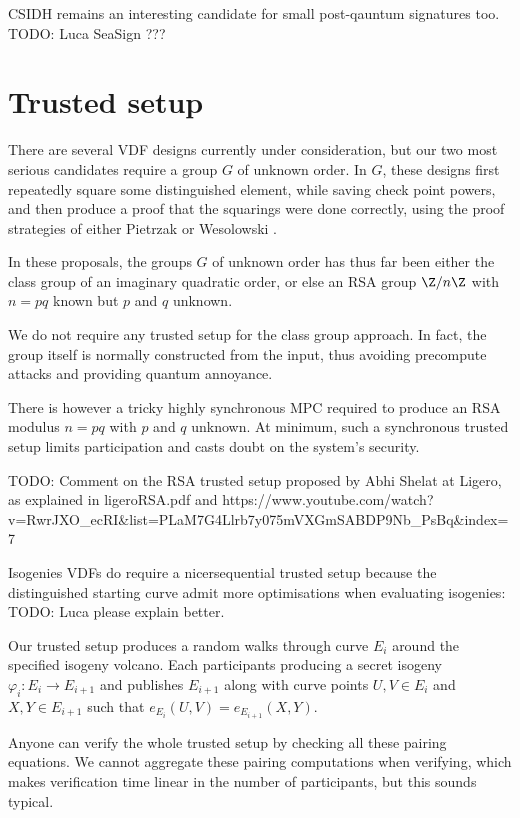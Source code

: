 \documentclass{article}
\begin{document}
CSIDH remains an interesting candidate for small post-qauntum signatures
too.  TODO: Luca SeaSign ???



\section{Trusted setup}

There are several VDF designs currently under consideration, but
our two most serious candidates require a group $G$ of unknown order.
In $G$, these designs first repeatedly square some distinguished
element, while saving check point powers, and then produce a proof
that the squarings were done correctly, using the proof strategies
of either Pietrzak \cite{Pietrzak} or Wesolowski \cite{Wesolowski}.

In these proposals, the groups $G$ of unknown order has thus far been
either the class group of an imaginary quadratic order, or else an
RSA group $\Z/n\Z$ with $n = p q$ known but $p$ and $q$ unknown.

We do not require any trusted setup for the class group approach.
In fact, the group itself is normally constructed from the input,
thus avoiding precompute attacks and providing quantum annoyance.  

There is however a tricky highly synchronous MPC required to produce
an RSA modulus $n = p q$ with $p$ and $q$ unknown.  At minimum, such
a synchronous trusted setup limits participation and casts doubt on
the system's security.  

TODO: Comment on the RSA trusted setup proposed by Abhi Shelat at Ligero, as explained in ligeroRSA.pdf and  https://www.youtube.com/watch?v=RwrJXO_ecRI&list=PLaM7G4Llrb7y075mVXGmSABDP9Nb_PsBq&index=7

Isogenies VDFs do require a nicersequential trusted setup because the
distinguished starting curve admit more optimisations when evaluating
isogenies:
TODO: Luca please explain better.

Our trusted setup produces a random walks through curve $E_i$ around
the specified isogeny volcano.  Each participants producing a secret
isogeny $φ_i : E_i \to E_{i+1}$ and publishes $E_{i+1}$ along with
curve points $U,V \in E_i$ and $X,Y \in E_{i+1}$ such that
$e_{E_i}(U,V) = e_{E_{i+1}}(X,Y)$.  

Anyone can verify the whole trusted setup by checking all these
pairing equations.  We cannot aggregate these pairing computations
when verifying, which makes verification time linear in the number
of participants, but this sounds typical.
\end{document}
